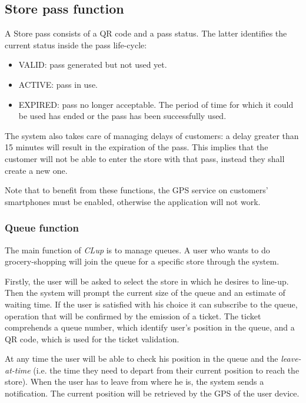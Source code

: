 \subsection{Store pass function}
	A Store pass consists of a QR code and a pass status. The latter identifies the current status inside the pass life-cycle:
	\begin{itemize}
		\item VALID: pass generated but not used yet.
		\item ACTIVE: pass in use.
		\item EXPIRED: pass no longer acceptable. The period of time for which it could be used has ended or the pass has been successfully used.
	\end{itemize}

	The system also takes care of managing delays of customers: a delay greater than 15 minutes will result in the expiration of the pass. This implies that the customer will not be able to enter the store with that pass, instead they shall create a new one.\newline

	Note that to benefit from these functions, the GPS service on customers' smartphones must be enabled, otherwise the application will not work.

	\subsubsection{Queue function}
	The main function of \textit{CLup} is to manage queues. A user who wants to do grocery-shopping will join the queue for a specific store through the system.\newline

	Firstly, the user will be asked to select the store in which he desires to line-up.\newline
	Then the system will prompt the current size of the queue and an estimate of waiting time. If the user is satisfied with his choice it can subscribe to the queue, operation that will be confirmed by the emission of a ticket. The ticket comprehends a queue number, which identify user's position in the queue, and a QR code, which is used for the ticket validation.

	At any time the user will be able to check his position in the queue and the \textit{leave-at-time} (i.e. the time they need to depart from their current position to reach the store). When the user has to leave from where he is, the system sends a notification. The current position will be retrieved by the GPS of the user device.

